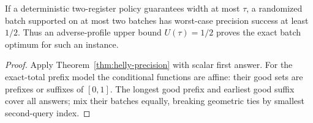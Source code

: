 
\begin{corollary}
\label{prop:counter-half-floor}
If a deterministic two-register policy guarantees width at most $\tau$,
a randomized batch supported on at most two batches has worst-case
precision success at least $1/2$. Thus an adverse-profile upper bound
$U(\tau)=1/2$ proves the exact batch optimum for such an instance.
\end{corollary}
\begin{proof}
Apply Theorem~\ref{thm:helly-precision} with scalar first answer.
For the exact-total prefix model the conditional functions are affine:
their good sets are prefixes or suffixes of $[0,1]$. The longest good
prefix and earliest good suffix cover all answers; mix their batches
equally, breaking geometric ties by smallest second-query index.
\end{proof}
